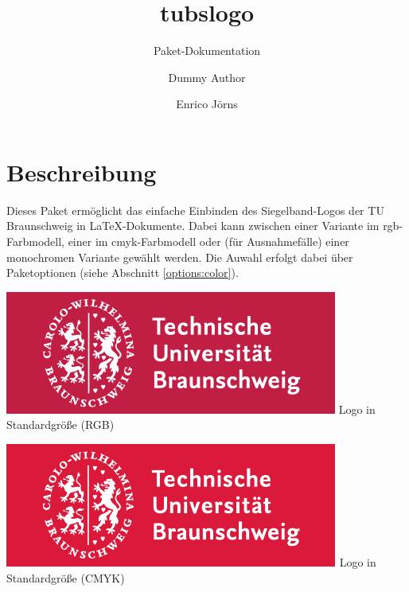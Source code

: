 \documentclass{scrartcl}
\title{tubslogo}
\subtitle{Paket-Dokumentation}
\author{Dummy Author \and Enrico Jörns}
\begin{document}
\maketitle

\section{Beschreibung}

Dieses Paket ermöglicht das einfache Einbinden des Siegelband-Logos
der TU Braunschweig in \LaTeX-Dokumente.
Dabei kann zwischen einer Variante im rgb-Farbmodell, einer im
cmyk-Farbmodell oder (für Ausnahmefälle) einer monochromen Variante gewählt
werden. Die Auwahl erfolgt dabei über Paketoptionen
(siehe Abschnitt \ref{options:color}).

\begin{minipage}{0.5\textwidth}
  \centering
  \includegraphics[width=\tulogoBaseWidth]{TUBraunschweig-rgb}
  {\sffamily Logo in Standardgröße (RGB)}
\end{minipage}
\begin{minipage}{0.5\textwidth}
  \centering
  \includegraphics[width=\tulogoBaseWidth]{TUBraunschweig_4C}
  {\sffamily Logo in Standardgröße (CMYK)}
\end{minipage}
\end{document}
